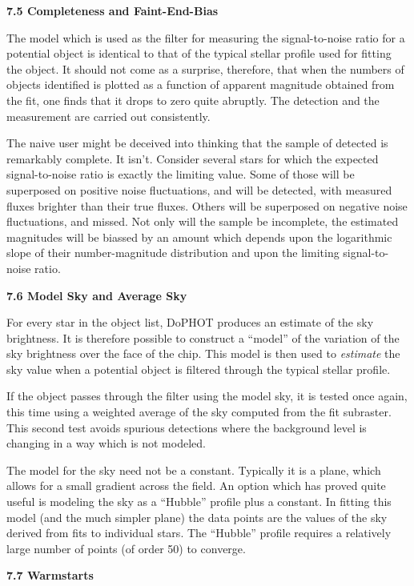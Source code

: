 \centerline{\bf 7.5 Completeness and Faint-End-Bias}

The model which is used as the filter for measuring the
signal-to-noise ratio for a potential object is identical to
that of the typical stellar profile used for fitting the
object.  It should not come as a surprise, therefore, that
when the numbers of objects identified is plotted as a
function of apparent magnitude obtained from the fit, one finds
that it drops to zero quite abruptly.  The detection and the
measurement are carried out consistently.

The naive user might be deceived into thinking that the
sample of detected is remarkably complete.  It isn't.
Consider several stars for which the expected
signal-to-noise ratio is exactly the limiting value.  Some
of those will be superposed on positive noise fluctuations,
and will be detected, with measured fluxes brighter than
their true fluxes.  Others will be superposed on negative
noise fluctuations, and missed.  Not only will the sample be
incomplete, the estimated magnitudes will be biassed by an
amount which depends upon the logarithmic slope of their
number-magnitude distribution and upon the limiting
signal-to-noise ratio.

\centerline{\bf 7.6 Model Sky and Average Sky}

For every star in the object list, DoPHOT produces an
estimate of the sky brightness.  It is therefore
possible to construct a ``model'' of the variation
of the sky brightness over the face of the chip.
This model is then used to {\it estimate} the sky value
when a potential object is filtered through the
typical stellar profile.

If the object passes through the filter using
the model sky, it is tested once again, this time
using a weighted average of the sky computed from
the fit subraster.  This second test avoids spurious
detections where the background level is changing
in a way which is not modeled.

The model for the sky need not be a constant.  Typically
it is a plane, which allows for a small gradient across
the field.  An option which has proved quite useful
is modeling the sky as a ``Hubble'' profile plus a
constant.   In fitting this model (and the much simpler
plane) the data points are the values of the sky derived
from fits to individual stars.  The ``Hubble'' profile
requires a relatively large number of points (of order 50)
to converge.

\centerline{\bf 7.7 Warmstarts}

